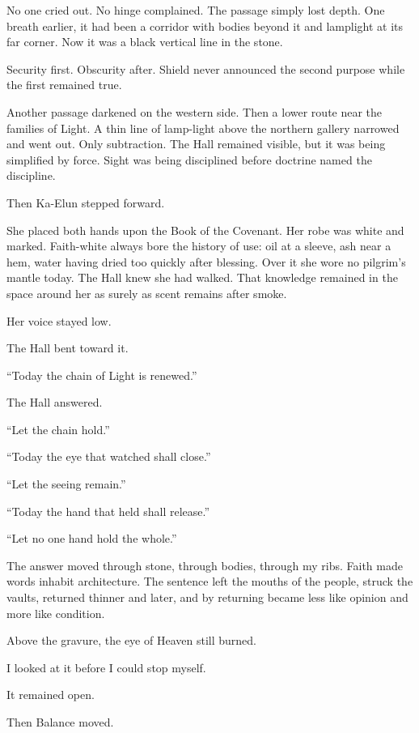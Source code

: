 No one cried out.
No hinge complained.
The passage simply lost depth.
One breath earlier, it had been a corridor with bodies beyond it and lamplight at its far corner.
Now it was a black vertical line in the stone.\par
Security first.
Obscurity after.
Shield never announced the second purpose while the first remained true.\par
Another passage darkened on the western side.
Then a lower route near the families of Light.
A thin line of lamp-light above the northern gallery narrowed and went out.
Only subtraction.
The Hall remained visible, but it was being simplified by force.
Sight was being disciplined before doctrine named the discipline.\par
Then Ka-Elun stepped forward.\par
She placed both hands upon the Book of the Covenant.
Her robe was white and marked.
Faith-white always bore the history of use: oil at a sleeve, ash near a hem, water having dried too quickly after blessing.
Over it she wore no pilgrim's mantle today.
The Hall knew she had walked.
That knowledge remained in the space around her as surely as scent remains after smoke.\par
Her voice stayed low.\par
The Hall bent toward it.\par
``Today the chain of Light is renewed.''\par
The Hall answered.\par
``Let the chain hold.''\par
``Today the eye that watched shall close.''\par
``Let the seeing remain.''\par
``Today the hand that held shall release.''\par
``Let no one hand hold the whole.''\par
The answer moved through stone, through bodies, through my ribs.
Faith made words inhabit architecture.
The sentence left the mouths of the people, struck the vaults, returned thinner and later, and by returning became less like opinion and more like condition.\par
Above the gravure, the eye of Heaven still burned.\par
I looked at it before I could stop myself.\par
It remained open.\par
Then Balance moved.\par
